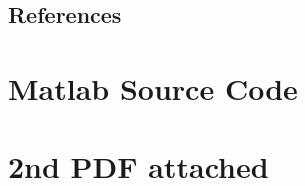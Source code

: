 \documentclass[english]{book}
\begin{document}
\section*{References}
\printbibliography[heading=none] %

\appendix
\chapter{Matlab Source Code}

\chapter{2nd PDF attached}
\end{document}
